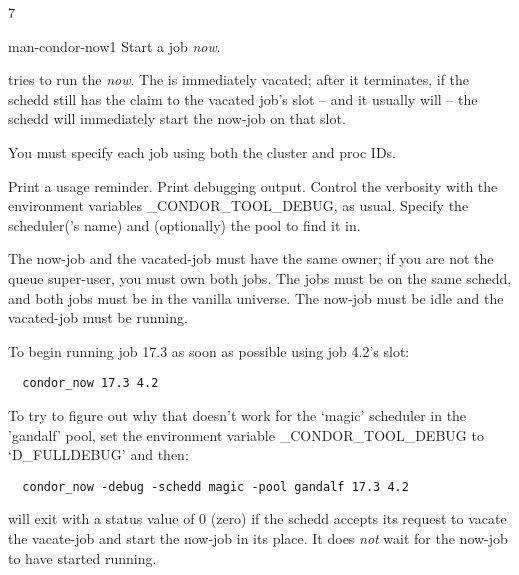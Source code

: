 7\begin{ManPage}{}{man-condor-now}{1}
{Start a job \emph{now}.}

\Synopsis

 

 
	 

\Description

 tries to run the  \emph{now}.  The 
is immediately vacated; after it terminates, if the schedd still has the
claim to the vacated job's slot -- and it usually will -- the schedd will
immediately start the now-job on that slot.

You must specify each job using both the cluster and proc IDs.

\begin{Options}
		{Print a usage reminder.}
		{Print debugging output.  Control the verbosity with the environment variables \_CONDOR\_TOOL\_DEBUG, as usual.}
		{Specify the scheduler('s name) and (optionally) the pool to find it in.}
\end{Options}

\GenRem

The now-job and the vacated-job must have the same owner; if you are not
the queue super-user, you must own both jobs.  The jobs must be on the same
schedd, and both jobs must be in the vanilla universe.  The now-job must be
idle and the vacated-job must be running.

\Examples

To begin running job 17.3 as soon as possible using job 4.2's slot:

\begin{verbatim}
  condor_now 17.3 4.2
\end{verbatim}

To try to figure out why that doesn't work for the `magic' scheduler in
the 'gandalf' pool, set the environment variable \_CONDOR\_TOOL\_DEBUG
to `D\_FULLDEBUG' and then:

\begin{verbatim}
  condor_now -debug -schedd magic -pool gandalf 17.3 4.2
\end{verbatim}

\ExitStatus

 will exit with a status value of 0 (zero) if the schedd accepts
its request to vacate the vacate-job and start the now-job in its place.  It
does \emph{not} wait for the now-job to have started running.

\end{ManPage}
